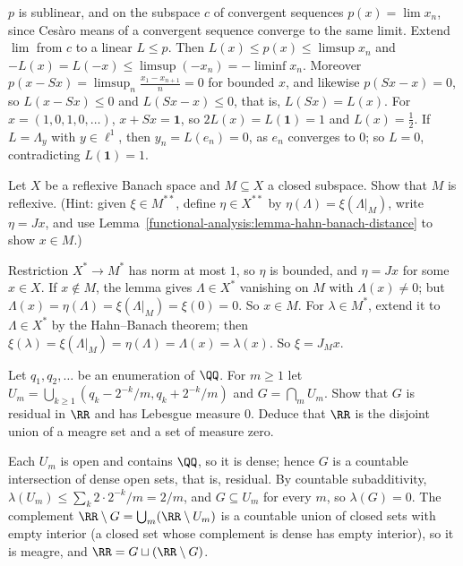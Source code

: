 \begin{solution}
$p$ is sublinear, and on the subspace $c$ of convergent sequences $p(x) = \lim x_n$, since Ces\`aro means of a convergent sequence converge to the same limit. Extend $\lim$ from $c$ to a linear $L \leq p$.
Then $L(x) \leq p(x) \leq \limsup x_n$ and $-L(x) = L(-x) \leq \limsup(-x_n) = -\liminf x_n$. Moreover $p(x - Sx) = \limsup_n\frac{x_1 - x_{n+1}}{n} = 0$ for bounded $x$, and likewise $p(Sx - x) = 0$, so
$L(x - Sx) \leq 0$ and $L(Sx - x) \leq 0$, that is, $L(Sx) = L(x)$. For $x = (1, 0, 1, 0, \ldots)$, $x + Sx = \mathbf{1}$, so $2L(x) = L(\mathbf{1}) = 1$ and $L(x) = \frac12$. If $L = \Lambda_y$ with $y \in \ell^1$, then
$y_n = L(e_n) = 0$, as $e_n$ converges to $0$; so $L = 0$, contradicting $L(\mathbf{1}) = 1$.
\end{solution}

\begin{exercise}\label{functional-analysis:exercise-closed-subspace-reflexive}
Let $X$ be a reflexive Banach space and $M \subseteq X$ a closed subspace. Show that $M$ is reflexive. (Hint: given $\xi \in M^{**}$, define $\eta \in X^{**}$ by $\eta(\Lambda) = \xi(\Lambda|_M)$, write $\eta = Jx$, and
use Lemma~\ref{functional-analysis:lemma-hahn-banach-distance} to show $x \in M$.)
\end{exercise}

\begin{solution}
Restriction $X^* \to M^*$ has norm at most $1$, so $\eta$ is bounded, and $\eta = Jx$ for some $x \in X$. If $x \notin M$, the lemma gives $\Lambda \in X^*$ vanishing on $M$ with $\Lambda(x) \neq 0$; but
$\Lambda(x) = \eta(\Lambda) = \xi(\Lambda|_M) = \xi(0) = 0$. So $x \in M$. For $\lambda \in M^*$, extend it to $\Lambda \in X^*$ by the Hahn--Banach theorem; then $\xi(\lambda) = \xi(\Lambda|_M) = \eta(\Lambda) = \Lambda(x) = \lambda(x)$.
So $\xi = J_Mx$.
\end{solution}

\begin{exercise}\label{functional-analysis:exercise-meagre-null}
Let $q_1, q_2, \ldots$ be an enumeration of $\QQ$. For $m \geq 1$ let $U_m = \bigcup_{k \geq 1}(q_k - 2^{-k}/m, q_k + 2^{-k}/m)$ and $G = \bigcap_mU_m$. Show that $G$ is residual in $\RR$ and has
Lebesgue measure $0$. Deduce that $\RR$ is the disjoint union of a meagre set and a set of measure zero.
\end{exercise}

\begin{solution}
Each $U_m$ is open and contains $\QQ$, so it is dense; hence $G$ is a countable intersection of dense open sets, that is, residual. By countable subadditivity, $\lambda(U_m) \leq \sum_k2 \cdot 2^{-k}/m = 2/m$,
and $G \subseteq U_m$ for every $m$, so $\lambda(G) = 0$. The complement $\RR \setminus G = \bigcup_m(\RR \setminus U_m)$ is a countable union of closed sets with empty interior (a closed set whose complement
is dense has empty interior), so it is meagre, and $\RR = G \sqcup (\RR \setminus G)$.
\end{solution}
